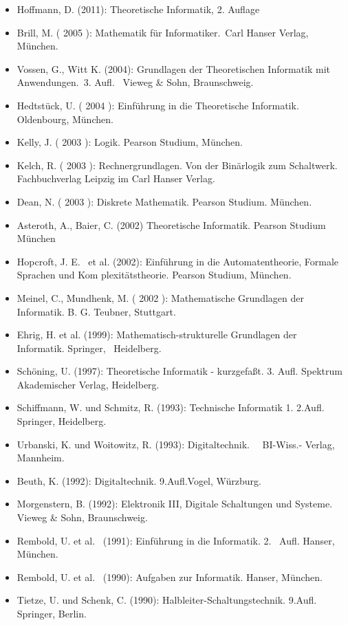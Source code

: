 \begin{itemize}
\tightlist
\item
  Hoffmann, D. (2011): Theoretische Informatik, 2. Auflage
\item
  Brill, M. ( 2005 ): Mathematik für Informatiker.~Carl Hanser Verlag,
  München.
\item
  Vossen, G., Witt K. (2004): Grundlagen der Theoretischen Informatik
  mit Anwendungen.~3. Aufl.~ Vieweg \& Sohn, Braunschweig.
\item
  Hedtstück, U. ( 2004 ): Einführung in die Theoretische Informatik.
  Oldenbourg, München.
\item
  Kelly, J. ( 2003 ): Logik. Pearson Studium, München.
\item
  Kelch, R. ( 2003 ): Rechnergrundlagen. Von der Binärlogik zum
  Schaltwerk. Fachbuchverlag Leipzig im Carl Hanser Verlag.
\item
  Dean, N. ( 2003 ): Diskrete Mathematik. Pearson Studium. München.
\item
  Asteroth, A., Baier, C. (2002) Theoretische Informatik. Pearson
  Studium München
\item
  Hopcroft, J. E.~ et al. (2002): Einführung in die Automatentheorie,
  Formale Sprachen und Kom plexitätstheorie. Pearson Studium, München.
\item
  Meinel, C., Mundhenk, M. ( 2002 ): Mathematische Grundlagen der
  Informatik. B. G. Teubner, Stuttgart.
\item
  Ehrig, H. et al. (1999): Mathematisch-strukturelle Grundlagen der
  Informatik. Springer,~ Heidelberg.
\item
  Schöning, U. (1997): Theoretische Informatik - kurzgefaßt. 3. Aufl.
  Spektrum Akademischer Verlag, Heidelberg.
\item
  Schiffmann, W. und Schmitz, R. (1993): Technische Informatik 1.
  2.Aufl. Springer, Heidelberg.
\item
  Urbanski, K. und Woitowitz, R. (1993): Digitaltechnik.~~ BI-Wiss.-
  Verlag, Mannheim.
\item
  Beuth, K. (1992): Digitaltechnik. 9.Aufl.Vogel, Würzburg.
\item
  Morgenstern, B. (1992): Elektronik III, Digitale Schaltungen und
  Systeme. Vieweg \& Sohn, Braunschweig.
\item
  Rembold, U. et al.~ (1991): Einführung in die Informatik. 2.~ Aufl.
  Hanser, München.~~~~~~~~~~~~~~~~~~~~~~~~~~~~~~~
\item
  Rembold, U. et al.~ (1990): Aufgaben zur Informatik. Hanser, München.
\item
  Tietze, U. und Schenk, C. (1990): Halbleiter-Schaltungstechnik.
  9.Aufl. Springer, Berlin.
\end{itemize}

